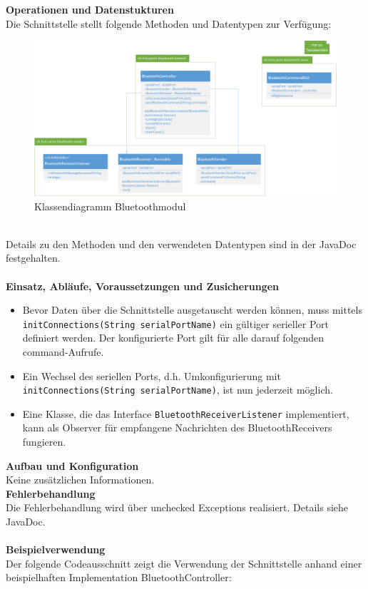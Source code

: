 \noindent
\textbf{Operationen und Datenstukturen} \\
Die Schnittstelle stellt folgende Methoden und Datentypen zur Verfügung:  \\
\begin{figure}[h!]          
	\centering             
	\includegraphics[width=1\textwidth]{../fig/Klassendiagramm_Bluetoothmodul.png}
	\caption{Klassendiagramm Bluetoothmodul}
	\label{fig:Klassendiagramm Bluetoothmodul}        
\end{figure} \\
Details zu den Methoden und den verwendeten Datentypen sind in der JavaDoc festgehalten. \\\\
\textbf{Einsatz, Abläufe, Voraussetzungen und Zusicherungen}
\begin{itemize}
	\item{Bevor Daten über die Schnittstelle ausgetauscht werden können, muss mittels \\
        \verb?initConnections(String serialPortName)? ein gültiger serieller 
        Port definiert werden. Der konfigurierte Port gilt für alle darauf 
        folgenden command-Aufrufe. }
	\item{Ein Wechsel des seriellen Ports, d.h. Umkonfigurierung mit \verb?initConnections(String serialPortName)?, ist nun jederzeit möglich.}
	\item{Eine Klasse, die das Interface \verb?BluetoothReceiverListener? implementiert, kann als Observer für empfangene Nachrichten des BluetoothReceivers fungieren.}
\end{itemize}
\textbf{Aufbau und Konfiguration} \\
Keine zusätzlichen Informationen. \\
\textbf{Fehlerbehandlung} \\
Die Fehlerbehandlung wird über unchecked Exceptions realisiert. Details siehe JavaDoc. \\\\
\textbf{Beispielverwendung} \\
Der folgende Codeausschnitt zeigt die Verwendung der Schnittstelle anhand 
einer beispielhaften Implementation BluetoothController: 


